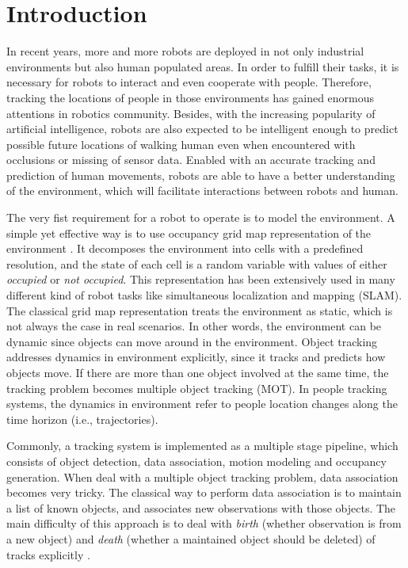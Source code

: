 \chapter{Introduction}

In recent years, more and more robots are deployed in not only industrial environments but also human populated areas. In order to fulfill their tasks, it is necessary for robots to interact and even cooperate with people. Therefore, tracking the locations of people in those environments has gained enormous attentions in robotics community. Besides, with the increasing popularity of artificial intelligence, robots are also expected to be intelligent enough to predict possible future locations of walking human even when encountered with occlusions or missing of sensor data. Enabled with an accurate tracking and prediction of human movements, robots are able to have a better understanding of the environment, which will facilitate interactions between robots and human.

The very fist requirement for a robot to operate is to model the environment. A simple yet effective way is to use occupancy grid map representation of the environment \citep{elfes1989using}. It decomposes the environment into cells with a predefined resolution, and the state of each cell is a random variable with values of either \textit{occupied} or \textit{not occupied}. This representation has been extensively used in many different kind of robot tasks like simultaneous localization and mapping (SLAM). The classical grid map representation treats the environment as static, which is not always the case in real scenarios. In other words, the environment can be dynamic since objects can move around in the environment. Object tracking addresses dynamics in environment explicitly, since it tracks and predicts how objects move. If there are more than one object involved at the same time, the tracking problem becomes multiple object tracking (MOT). In people tracking systems, the dynamics in environment refer to people location changes along the time horizon (i.e., trajectories). 

Commonly, a tracking system is implemented as a multiple stage pipeline, which consists of object detection, data association, motion modeling and occupancy generation. When deal with a multiple object tracking problem, data association becomes very tricky. The classical way to perform data association is to maintain a list of known objects, and associates new observations with those objects. The main difficulty of this approach is to deal with \textit{birth} (whether observation is from a new object) and \textit{death} (whether a maintained object should be deleted) of tracks explicitly \citep{gauvrit1997formulation}. 

